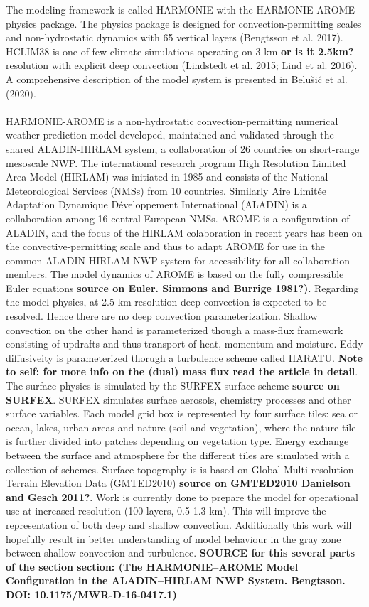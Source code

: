 The modeling framework is called HARMONIE with the HARMONIE-AROME physics package. The physics package is designed for convection-permitting scales and non-hydrostatic dynamics with 65 vertical layers (Bengtsson et al. 2017)\cite{bengtsson_arome}. HCLIM38 is one of few climate simulations operating on 3 km \textbf{or is it 2.5km?} resolution with explicit deep convection (Lindstedt et al. 2015\cite{lindstedt_hclim}; Lind et al. 2016\cite{lind_hclim}). A comprehensive description of the model system is presented in Belušić et al.(2020)\cite{belusic_hclim}.  
\\
\\
HARMONIE-AROME is a non-hydrostatic convection-permitting numerical weather prediction model developed, maintained and validated through the shared ALADIN-HIRLAM system, a collaboration of 26 countries on short-range mesoscale NWP. The international research program High Resolution Limited Area Model (HIRLAM) was initiated in 1985 and consists of the National Meteorological Services (NMSs) from 10 countries. Similarly Aire Limitée Adaptation Dynamique Développement International (ALADIN) is a collaboration among 16 central-European NMSs. AROME is a configuration of ALADIN, and the focus of the HIRLAM colaboration in recent years has been on the convective-permitting scale and thus to adapt AROME for use in the common ALADIN-HIRLAM NWP system for accessibility for all collaboration members. The model dynamics of AROME is based on the fully compressible Euler equations \textbf{source on Euler. Simmons and Burrige 1981?)}. Regarding the model physics, at 2.5-km resolution deep convection is expected to be resolved. Hence there are no deep convection parameterization. Shallow convection on the other hand is parameterized though a mass-flux framework consisting of updrafts and thus transport of heat, momentum and moisture. Eddy diffusiveity is parameterized thorugh a turbulence scheme called HARATU. \textbf{Note to self: for more info on the (dual) mass flux read the article in detail}. The surface physics is simulated by the SURFEX surface scheme \textbf{source on SURFEX}. SURFEX simulates surface aerosols, chemistry processes and other surface variables. Each model grid box is represented by four surface tiles: sea or ocean, lakes, urban areas and nature (soil and vegetation), where the nature-tile is further divided into patches depending on vegetation type. Energy exchange between the surface and atmosphere for the different tiles are simulated with a collection of schemes. Surface topography is is based on Global Multi-resolution Terrain Elevation Data (GMTED2010) \textbf{source on GMTED2010 Danielson and Gesch 2011?}. Work is currently done to prepare the model for operational use at increased resolution (100 layers, 0.5-1.3 km). This will improve the representation of both deep and shallow convection. Additionally this work will hopefully result in better understanding of model behaviour in the gray zone between shallow convection and turbulence. \textbf{SOURCE for this several parts of the section section: 
(The HARMONIE–AROME Model Configuration in the ALADIN–HIRLAM
NWP System. Bengtsson. DOI: 10.1175/MWR-D-16-0417.1)}
\\
\\

